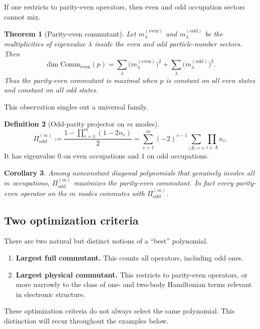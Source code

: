 \documentclass[11pt]{article}
\newcommand{\odd}{\mathrm{odd}}
\newcommand{\even}{\mathrm{even}}
\newcommand{\Comm}{\mathrm{Comm}}
\newtheorem{theorem}{Theorem}[section]
\newtheorem{corollary}[theorem]{Corollary}
\theoremstyle{definition}
\newtheorem{definition}[theorem]{Definition}
\theoremstyle{remark}
\begin{document}
If one restricts to parity-even operators, then even and odd occupation sectors cannot mix.

\begin{theorem}[Parity-even commutant]
Let $m_\lambda^{(\even)}$ and $m_\lambda^{(\odd)}$ be the multiplicities of eigenvalue $\lambda$ inside the even and odd particle-number sectors. Then
\begin{equation}
  \dim \Comm_{\even}(p)
  =
  \sum_\lambda \bigl(m_\lambda^{(\even)}\bigr)^2
  +
  \sum_\lambda \bigl(m_\lambda^{(\odd)}\bigr)^2.
\end{equation}
Thus the parity-even commutant is maximal when $p$ is constant on all even states and constant on all odd states.
\end{theorem}

This observation singles out a universal family.

\begin{definition}[Odd-parity projector on $m$ modes]
\begin{equation}
  \Pi^{(m)}_{\odd}
  :=
  \frac{1-\prod_{r=1}^m(1-2n_r)}{2}
  =
  \sum_{s=1}^m (-2)^{s-1}
  \sum_{|A|=s}\prod_{i\in A}n_i.
\end{equation}
It has eigenvalue $0$ on even occupations and $1$ on odd occupations.
\end{definition}

\begin{corollary}
Among nonconstant diagonal polynomials that genuinely involve all $m$ occupations, $\Pi^{(m)}_{\odd}$ maximizes the parity-even commutant. In fact every parity-even operator on the $m$ modes commutes with $\Pi^{(m)}_{\odd}$.
\end{corollary}

\subsection{Two optimization criteria}
There are two natural but distinct notions of a ``best'' polynomial.
\begin{enumerate}[leftmargin=2em]
  \item \textbf{Largest full commutant.} This counts all operators, including odd ones.
  \item \textbf{Largest physical commutant.} This restricts to parity-even operators, or more narrowly to the class of one- and two-body Hamiltonian terms relevant in electronic structure.
\end{enumerate}
These optimization criteria do not always select the same polynomial. This distinction will recur throughout the examples below.
\end{document}
